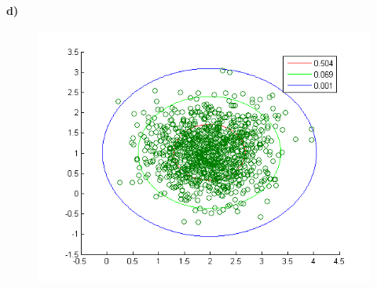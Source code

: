 \documentclass{article}
\begin{document}
\paragraph{d)}
\begin{figure}[H]
\centering
\includegraphics[scale=0.7]{Fig21.png}
\end{figure}
\end{document}
